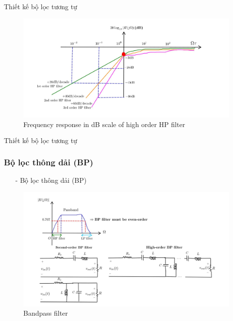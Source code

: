 \documentclass[8pt]{beamer}
\begin{document}
\begin{frame}{Thiết kế bộ lọc tương tự}
\begin{figure}[h]
			\includegraphics[width=1.1\textwidth]{9.jpg}
		\caption{Frequency response in dB scale of high order HP filter}			\label{fig:re2}
		\end{figure}

\end{frame}
\begin{frame}{Thiết kế bộ lọc tương tự}
\subsubsection{Bộ lọc thông dải (BP)}
\begin{itemize}
	\item[-] Bộ lọc thông dải (BP)
\end{itemize}

\begin{figure}[h]
			\includegraphics[width=1.1\textwidth]{10.jpg}
		\caption{Bandpass filter}			\label{fig:re2}
		\end{figure}
\end{frame}
\end{document}
